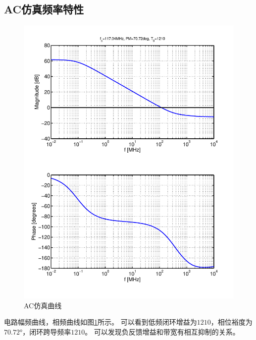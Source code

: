 \documentclass[a4paper]{article}
\newcommand{\udeg}{\si{\degree}}
\begin{document}
\subsection{AC仿真频率特性}
\begin{figure}[htb]
    \begin{center}
        \includegraphics[width=\textwidth]{fast/ac.pdf}
    \end{center}
    \caption{AC仿真曲线}
    \label{fastac}
\end{figure}
电路幅频曲线，相频曲线如图\ref{fastac}所示。
可以看到低频闭环增益为$1210$，相位裕度为$70.72\udeg$，闭环跨导频率$1210$。
可以发现负反馈增益和带宽有相互抑制的关系。
\newpage
\clearpage
\end{document}
